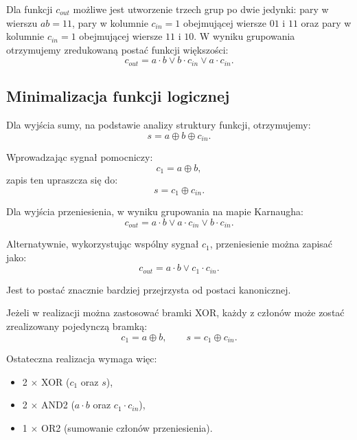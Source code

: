 Dla funkcji $c_{out}$ możliwe jest utworzenie trzech grup po dwie jedynki: pary w wierszu $ab = 11$, pary w kolumnie $c_{in} = 1$ obejmującej wiersze $01$ i $11$ oraz pary w kolumnie $c_{in} = 1$ obejmującej wiersze $11$ i $10$. W wyniku grupowania otrzymujemy zredukowaną postać funkcji większości:
\begin{equation*}
c_{out} = a \cdot b \vee b \cdot c_{in} \vee a \cdot c_{in}.
\end{equation*}

\subsection{Minimalizacja funkcji logicznej}

Dla wyjścia sumy, na podstawie analizy struktury funkcji, otrzymujemy:
\begin{equation*}
s = a \oplus b \oplus c_{in}.
\end{equation*}

Wprowadzając sygnał pomocniczy:
\begin{equation*}
c_1 = a \oplus b,
\end{equation*}
zapis ten upraszcza się do:
\begin{equation*}
s = c_1 \oplus c_{in}.
\end{equation*}

Dla wyjścia przeniesienia, w wyniku grupowania na mapie Karnaugha:
\begin{equation*}
c_{out} = a \cdot b \vee a \cdot c_{in} \vee b \cdot c_{in}.
\end{equation*}

Alternatywnie, wykorzystując wspólny sygnał $c_1$, przeniesienie można zapisać jako:
\begin{equation*}
c_{out} = a \cdot b \vee c_1 \cdot c_{in}.
\end{equation*}

Jest to postać znacznie bardziej przejrzysta od postaci kanonicznej.

Jeżeli w realizacji można zastosować bramki XOR, każdy z członów może zostać zrealizowany pojedynczą bramką:
\begin{equation*}
c_1 = a \oplus b, \qquad s = c_1 \oplus c_{in}.
\end{equation*}

Ostateczna realizacja wymaga więc:
\begin{itemize}
    \item 2 $\times$ XOR ($c_1$ oraz $s$),
    \item 2 $\times$ AND2 ($a \cdot b$ oraz $c_1 \cdot c_{in}$),
    \item 1 $\times$ OR2 (sumowanie członów przeniesienia).
\end{itemize}

